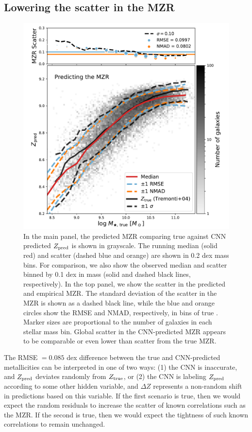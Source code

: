 \documentclass[fleqn,usenatbib]{mnras}
\begin{document}
\subsection{Lowering the scatter in the MZR}
\begin{figure}
	\includegraphics[width=\columnwidth]{06-mzr.pdf}
	\caption{\label{fig:mzr}
		In the main panel, the predicted MZR comparing true \mstar{} against CNN predicted $Z_{\rm pred}$ is shown in grayscale. The running median (solid red) and scatter (dashed blue and orange) are shown in 0.2 dex mass bins. For comparison, we also show the \citet{Tremonti2004} observed median and scatter binned by 0.1 dex in mass (solid and dashed black lines, respectively). In the top panel, we show the scatter in the predicted and empirical MZR. The standard deviation of the scatter in the MZR is shown as a dashed black line, while the blue and orange circles show the RMSE and NMAD, respectively, in bins of true \mstar{}. Marker sizes are proportional to the number of galaxies in each stellar mass bin. Global scatter in the CNN-predicted MZR appears to be comparable or even lower than scatter from the true MZR.}
\end{figure}

The RMSE $= 0.085$ dex difference between the true and CNN-predicted metallicities can be interpreted in one of two ways: (1) the CNN is inaccurate, and $Z_{\rm pred}$ deviates randomly from $Z_{\rm true}$, or (2) the CNN is labeling $Z_{\rm pred}$ according to some other hidden variable, and $\Delta Z$ represents a non-random shift in predictions based on this variable. If the first scenario is true, then we would expect the random residuals to increase the scatter of known correlations such as the MZR. If the second is true, then we would expect the tightness of such known correlations to remain unchanged.
\end{document}
